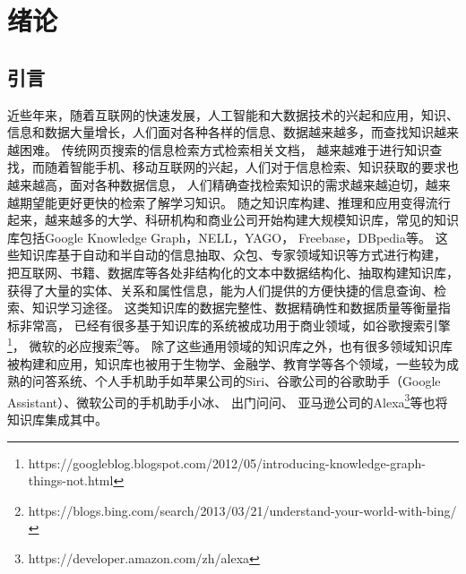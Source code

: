 
\chapter{绪论}
\label{cha:intro}
\section{引言}

近些年来，随着互联网的快速发展，人工智能和大数据技术的兴起和应用，知识、信息和数据大量增长，人们面对各种各样的信息、数据越来越多，而查找知识越来越困难。
传统网页搜索的信息检索方式检索相关文档，
越来越难于进行知识查找，而随着智能手机、移动互联网的兴起，人们对于信息检索、知识获取的要求也越来越高，面对各种数据信息，
人们精确查找检索知识的需求越来越迫切，越来越期望能更好更快的检索了解学习知识。
随之知识库构建、推理和应用变得流行起来，越来越多的大学、科研机构和商业公司开始构建大规模知识库，常见的知识库包括Google Knowledge Graph\cite{Dong2014FromDF}，NELL\cite{NELL-aaai15}，YAGO\cite{Suchanek:2007:YCS:1242572.1242667}，
Freebase\cite{Bollacker2008FreebaseAC}，DBpedia\cite{Bizer:2009:DCP:1640541.1640848}等。
这些知识库基于自动和半自动的信息抽取\cite{Gao2005KnowledgeBasedIE}、众包\cite{Meng2017KnowledgeBS}、专家领域知识\cite{Shenassa2008KnowledgeBE}等方式进行构建，
把互联网、书籍、数据库等各处非结构化的文本中数据结构化、抽取构建知识库，
获得了大量的实体、关系和属性信息，能为人们提供的方便快捷的信息查询、检索、知识学习途径。
这类知识库的数据完整性、数据精确性和数据质量等衡量指标非常高，
已经有很多基于知识库的系统被成功用于商业领域，如谷歌搜索引擎\footnote{https://googleblog.blogspot.com/2012/05/introducing-knowledge-graph-things-not.html}，
微软的必应搜索\footnote{https://blogs.bing.com/search/2013/03/21/understand-your-world-with-bing/}等。
除了这些通用领域的知识库之外，也有很多领域知识库被构建和应用，知识库也被用于生物学\cite{Dumontier:2014:BRL:2878453.2878554}、金融学、教育学等各个领域，一些较为成熟的问答系统、个人手机助手如苹果公司的Siri、谷歌公司的谷歌助手（Google Assistant）、微软公司的手机助手小冰、%
出门问问、%
亚马逊公司的Alexa\footnote{https://developer.amazon.com/zh/alexa}等也将知识库集成其中。

